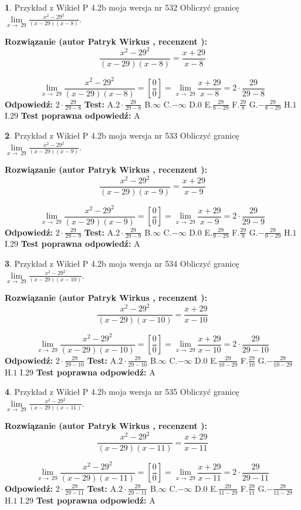 \documentclass[12pt, a4paper]{article}
\theoremstyle{definition} %
\newtheorem{zad}{}
\newcommand{\zadStart}[1]{\begin{zad}#1\newline}
\newcommand{\zadStop}{\end{zad}}
\newcommand{\rozwStart}[2]{\noindent \textbf{Rozwiązanie (autor #1 , recenzent #2): }\newline}
\newcommand{\rozwStop}{\newline}
\newcommand{\odpStart}{\noindent \textbf{Odpowiedź:}\newline}
\newcommand{\odpStop}{\newline}
\newcommand{\testStart}{\noindent \textbf{Test:}\newline}
\newcommand{\testStop}{\newline}
\newcommand{\kluczStart}{\noindent \textbf{Test poprawna odpowiedź:}\newline}
\newcommand{\kluczStop}{\newline}
\begin{document}
\zadStart{Przykład z Wikieł P 4.2b moja wersja nr 532}
Obliczyć granicę $\lim\limits_{x\to\ 29}\frac{x^{2}-29^{2}}{(x-29)(x-8)}$.
\zadStop
\rozwStart{Patryk Wirkus}{}
$$\frac{x^{2}-29^{2}}{(x-29)(x-8)}=\frac{x+29}{x-8}$$

$$\lim\limits_{x\to\ 29}\frac{x^{2}-29^{2}}{(x-29)(x-8)}=[\frac{0}{0}]=\lim\limits_{x\to\ 29}\frac{x+29}{x-8}=2 \cdot \frac{29}{29-8}$$
\rozwStop
\odpStart
$2 \cdot \frac{29}{29-8}$
\odpStop
\testStart
A.$2 \cdot \frac{29}{29-8}$
B.$\infty$
C.$-\infty$
D.$0$
E.$\frac{29}{8-29}$
F.$\frac{29}{8}$
G.$-\frac{29}{8-29}$
H.$1$
I.$29$
\testStop
\kluczStart
A
\kluczStop



\zadStart{Przykład z Wikieł P 4.2b moja wersja nr 533}
Obliczyć granicę $\lim\limits_{x\to\ 29}\frac{x^{2}-29^{2}}{(x-29)(x-9)}$.
\zadStop
\rozwStart{Patryk Wirkus}{}
$$\frac{x^{2}-29^{2}}{(x-29)(x-9)}=\frac{x+29}{x-9}$$

$$\lim\limits_{x\to\ 29}\frac{x^{2}-29^{2}}{(x-29)(x-9)}=[\frac{0}{0}]=\lim\limits_{x\to\ 29}\frac{x+29}{x-9}=2 \cdot \frac{29}{29-9}$$
\rozwStop
\odpStart
$2 \cdot \frac{29}{29-9}$
\odpStop
\testStart
A.$2 \cdot \frac{29}{29-9}$
B.$\infty$
C.$-\infty$
D.$0$
E.$\frac{29}{9-29}$
F.$\frac{29}{9}$
G.$-\frac{29}{9-29}$
H.$1$
I.$29$
\testStop
\kluczStart
A
\kluczStop



\zadStart{Przykład z Wikieł P 4.2b moja wersja nr 534}
Obliczyć granicę $\lim\limits_{x\to\ 29}\frac{x^{2}-29^{2}}{(x-29)(x-10)}$.
\zadStop
\rozwStart{Patryk Wirkus}{}
$$\frac{x^{2}-29^{2}}{(x-29)(x-10)}=\frac{x+29}{x-10}$$

$$\lim\limits_{x\to\ 29}\frac{x^{2}-29^{2}}{(x-29)(x-10)}=[\frac{0}{0}]=\lim\limits_{x\to\ 29}\frac{x+29}{x-10}=2 \cdot \frac{29}{29-10}$$
\rozwStop
\odpStart
$2 \cdot \frac{29}{29-10}$
\odpStop
\testStart
A.$2 \cdot \frac{29}{29-10}$
B.$\infty$
C.$-\infty$
D.$0$
E.$\frac{29}{10-29}$
F.$\frac{29}{10}$
G.$-\frac{29}{10-29}$
H.$1$
I.$29$
\testStop
\kluczStart
A
\kluczStop



\zadStart{Przykład z Wikieł P 4.2b moja wersja nr 535}
Obliczyć granicę $\lim\limits_{x\to\ 29}\frac{x^{2}-29^{2}}{(x-29)(x-11)}$.
\zadStop
\rozwStart{Patryk Wirkus}{}
$$\frac{x^{2}-29^{2}}{(x-29)(x-11)}=\frac{x+29}{x-11}$$

$$\lim\limits_{x\to\ 29}\frac{x^{2}-29^{2}}{(x-29)(x-11)}=[\frac{0}{0}]=\lim\limits_{x\to\ 29}\frac{x+29}{x-11}=2 \cdot \frac{29}{29-11}$$
\rozwStop
\odpStart
$2 \cdot \frac{29}{29-11}$
\odpStop
\testStart
A.$2 \cdot \frac{29}{29-11}$
B.$\infty$
C.$-\infty$
D.$0$
E.$\frac{29}{11-29}$
F.$\frac{29}{11}$
G.$-\frac{29}{11-29}$
H.$1$
I.$29$
\testStop
\kluczStart
A
\kluczStop
\end{document}
